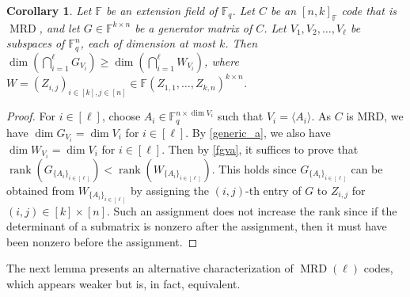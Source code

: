 \documentclass[11pt]{article}
\theoremstyle{plain}
\newtheorem{cor}[thm]{Corollary}
\theoremstyle{definition}
\newtheorem{defn}[thm]{Definition}
\theoremstyle{remark}
\newcommand{\F}{\mathbb{F}}
\newcommand{\K}{\mathbb{K}}
\begin{document}
\begin{cor}\label{cor:semicontinuity}
Let $\F$ be an extension field of $\F_q$.
Let $C$ be an $[n,k]_{\F}$ code that is $\operatorname{MRD}$, and let $G\in\F^{k\times n}$ be a generator matrix of $C$.
Let $V_1,V_2,\dots,V_\ell$ be subspaces of $\F_q^n$, each of dimension at most $k$.
Then $\dim\left(\bigcap_{i=1}^{\ell}G_{V_i}\right)\geq \dim \left(\bigcap_{i=1}^{\ell}W_{V_i}\right)$, where $W=(Z_{i,j})_{i\in [k], j\in [n]}\in\F(Z_{1,1},\dots,Z_{k,n})^{k\times n}$.
\end{cor}

\begin{proof}
For $i\in [\ell]$, choose $A_i\in\F_q^{n\times \dim V_i}$ such that $V_i=\langle A_i\rangle$.
As $C$ is MRD, we have $\dim G_{V_i}=\dim V_i$ for $i\in [\ell]$. By \cref{generic_a}, we also have $\dim W_{V_i}=\dim V_i$ for $i\in [\ell]$. Then by \cref{fgva}, it suffices to prove that $\operatorname{rank}\left(G_{\{A_i\}_{i\in[\ell]}}\right) < \operatorname{rank}\left(W_{\{A_i\}_{i\in[\ell]}}\right)$. This holds since $G_{\{A_i\}_{i\in[\ell]}}$ can be obtained from $W_{\{A_i\}_{i\in[\ell]}}$ by assigning the $(i,j)$-th entry of $G$ to $Z_{i,j}$ for $(i,j)\in [k]\times [n]$. Such an assignment does not increase the rank since if the determinant of a submatrix is nonzero after the assignment, then it must have been nonzero before the assignment.
\end{proof}


The next lemma presents an alternative characterization of $\operatorname{MRD}(\ell)$ codes, which appears weaker but is, in fact, equivalent.
\end{document}
